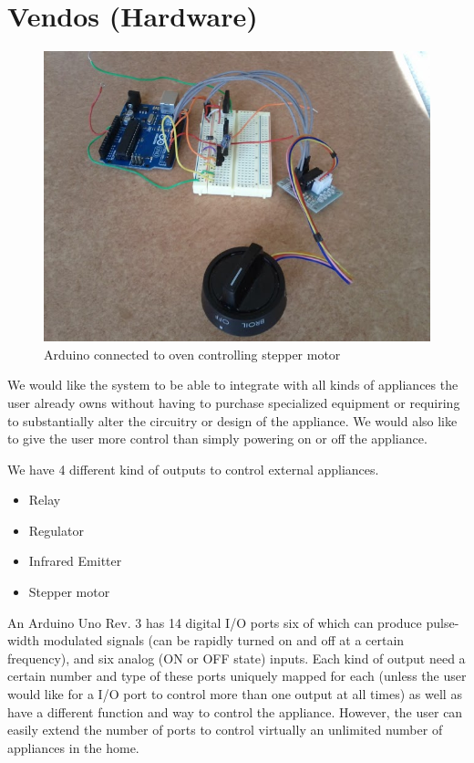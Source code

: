 \documentclass{chi-ext}
\begin{document}
%
\section{Vendos (Hardware)}

\begin{figure}
  \begin{center}
  \includegraphics[width=\linewidth]{vendos.png}
  \caption{Arduino connected to oven controlling stepper motor}
  \label{fig:marginparsample}
  \end{center}  
\end{figure}


We would like the system to be able to integrate with all kinds of appliances the user already owns without having to purchase specialized equipment or requiring to substantially alter the circuitry or design of the appliance.
We would also like to give the user more control than simply powering on or off the appliance.

We have 4 different kind of outputs to control external appliances.
\begin{itemize}\compresslist
\item
Relay
\item
Regulator
\item
Infrared Emitter
\item
Stepper motor
\end{itemize}


An Arduino Uno Rev. 3  has 14 digital I/O ports six of which can produce pulse-width modulated signals (can be rapidly turned on and off at a certain frequency), and six analog (ON or OFF state) inputs.
Each kind of output need a certain number and type of these ports uniquely mapped for each (unless the user would like for a I/O port to control more than one output at all times) as well as have a different function and way to control the appliance.
However, the user can easily extend the number of ports to control virtually an unlimited number of appliances in the home. \cite{_arduino}
\end{document}
